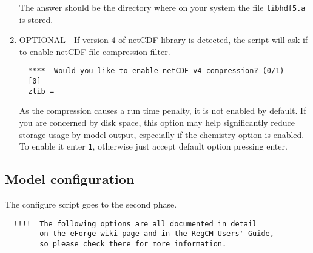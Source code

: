 \begin{enumerate}
The answer should be the directory where on your system the file
\verb=libhdf5.a= is stored.
\item OPTIONAL - If version 4 of netCDF library is detected, the script
will ask if to enable netCDF file compression filter.
\begin{Verbatim}
  ****  Would you like to enable netCDF v4 compression? (0/1)
  [0]
  zlib =
\end{Verbatim}
As the compression causes a run time penalty, it is not enabled by
default. If you are concerned by disk space, this option may help
significantly reduce storage usage by model output, especially if
the chemistry option is enabled. To enable it enter \verb=1=, otherwise
just accept default option pressing enter.
\end{enumerate}

\subsection{Model configuration}
\label{modconf}

The configure script goes to the second phase.

\begin{Verbatim}
  !!!!  The following options are all documented in detail 
        on the eForge wiki page and in the RegCM Users' Guide,
        so please check there for more information.
\end{Verbatim}

